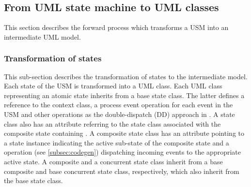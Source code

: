 \subsection{From UML state machine to UML classes}
This section describes the forward process which transforms a USM into an intermediate UML model. %

\subsubsection{Transformation of states}
\label{subsec:states}
This sub-section describes the transformation of states to the intermediate model. 
Each state of the USM is transformed into a UML class. Each UML class representing an atomic state inherits from a base state class. The latter defines a reference to the context class, a process event operation for each event in the USM and other operations as the double-dispatch (DD) approach in \cite{spinke_object-oriented_2013}. A state class  also has an attribute referring to the state class associated with the composite state containing . A composite state class has an attribute pointing to a state instance indicating the active sub-state of the composite state and a  operation (see \ref{subsec:codegen}) dispatching incoming events to the appropriate active state. A composite and a concurrent state class inherit from a base composite and base concurrent state class, respectively, which also inherit from the base state class. 

